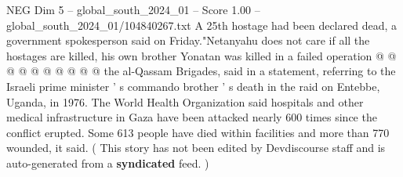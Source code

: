 \begin{textsample}{NEG Dim 5 – global\_south\_2024\_01 – Score 1.00 – global\_south\_2024\_01/104840267.txt}
A 25th hostage had been declared dead, a government spokesperson said on Friday."Netanyahu does not care if all the hostages are killed, his own brother Yonatan was killed in a failed operation @ @ @ @ @ @ @ @ @ @ the al-Qassam Brigades, said in a statement, referring to the Israeli prime minister ' s commando brother ' s death in the raid on Entebbe, Uganda, in 1976.
The World Health Organization said hospitals and other medical infrastructure in Gaza have been attacked nearly 600 times since the conflict erupted.
Some 613 people have died within facilities and more than 770 wounded, it said. ( This story has not been edited by Devdiscourse staff and is auto-generated from a \textbf{syndicated} feed. )

\end{textsample}
